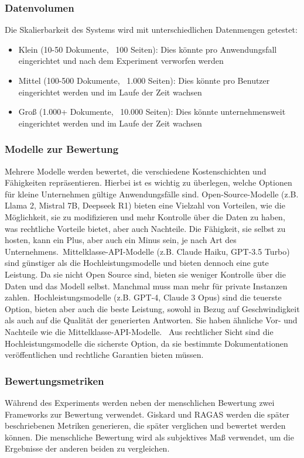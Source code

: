 \subsubsection{Datenvolumen}
Die Skalierbarkeit des Systems wird mit unterschiedlichen Datenmengen getestet:
\begin{itemize}
    \item Klein (10-50 Dokumente, ~100 Seiten): Dies könnte pro Anwendungsfall eingerichtet und nach dem Experiment verworfen werden
    \item Mittel (100-500 Dokumente, ~1.000 Seiten): Dies könnte pro Benutzer eingerichtet werden und im Laufe der Zeit wachsen
    \item Groß (1.000+ Dokumente, ~10.000 Seiten): Dies könnte unternehmensweit eingerichtet werden und im Laufe der Zeit wachsen
\end{itemize}

\subsubsection{Modelle zur Bewertung}
Mehrere Modelle werden bewertet, die verschiedene Kostenschichten und Fähigkeiten repräsentieren. Hierbei ist es wichtig zu überlegen, welche Optionen für kleine Unternehmen gültige Anwendungsfälle sind.
Open-Source-Modelle (z.B. Llama 2, Mistral 7B, Deepseek R1) bieten eine Vielzahl von Vorteilen, wie die Möglichkeit, sie zu modifizieren und mehr Kontrolle über die Daten zu haben, was rechtliche Vorteile bietet, aber auch Nachteile. Die Fähigkeit, sie selbst zu hosten, kann ein Plus, aber auch ein Minus sein, je nach Art des Unternehmens.\
Mittelklasse-API-Modelle (z.B. Claude Haiku, GPT-3.5 Turbo) sind günstiger als die Hochleistungsmodelle und bieten dennoch eine gute Leistung. Da sie nicht Open Source sind, bieten sie weniger Kontrolle über die Daten und das Modell selbst. Manchmal muss man mehr für private Instanzen zahlen.\
Hochleistungsmodelle (z.B. GPT-4, Claude 3 Opus) sind die teuerste Option, bieten aber auch die beste Leistung, sowohl in Bezug auf Geschwindigkeit als auch auf die Qualität der generierten Antworten. Sie haben ähnliche Vor- und Nachteile wie die Mittelklasse-API-Modelle. \
Aus rechtlicher Sicht sind die Hochleistungsmodelle die sicherste Option, da sie bestimmte Dokumentationen veröffentlichen und rechtliche Garantien bieten müssen.

\subsubsection{Bewertungsmetriken}
Während des Experiments werden neben der menschlichen Bewertung zwei Frameworks zur Bewertung verwendet.
Giskard und RAGAS werden die später beschriebenen Metriken generieren, die später verglichen und bewertet werden können.
Die menschliche Bewertung wird als subjektives Maß verwendet, um die Ergebnisse der anderen beiden zu vergleichen.

